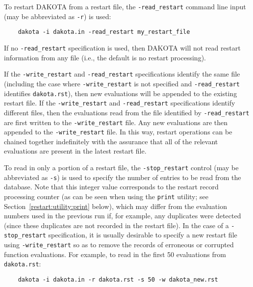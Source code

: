 To restart DAKOTA from a restart file, the \texttt{-read\_restart}
command line input (may be abbreviated as \texttt{-r}) is used:
\begin{small}
\begin{verbatim}
    dakota -i dakota.in -read_restart my_restart_file
\end{verbatim}
\end{small}

If no \texttt{-read\_restart} specification is used, then DAKOTA will
not read restart information from any file (i.e., the default is no
restart processing).

If the \texttt{-write\_restart} and \texttt{-read\_restart}
specifications identify the same file (including the case where
\texttt{-write\_restart} is not specified and \texttt{-read\_restart}
identifies \texttt{dakota.rst}), then new evaluations will be appended
to the existing restart file. If the \texttt{-write\_restart} and
\texttt{-read\_restart} specifications identify different files, then
the evaluations read from the file identified by
\texttt{-read\_restart} are first written to the
\texttt{-write\_restart} file. Any new evaluations are then appended
to the \texttt{-write\_restart} file. In this way, restart operations
can be chained together indefinitely with the assurance that all of
the relevant evaluations are present in the latest restart file.

To read in only a portion of a restart file, the
\texttt{-stop\_restart} control (may be abbreviated as \texttt{-s}) is
used to specify the number of entries to be read from the
database. Note that this integer value corresponds to the restart
record processing counter (as can be seen when using the
\texttt{print} utility; see Section~\ref{restart:utility:print} below),
which may differ from the evaluation numbers used in the previous run
if, for example, any duplicates were detected (since these duplicates
are not recorded in the restart file).  In the case of a
\texttt{-stop\_restart} specification, it is usually desirable to
specify a new restart file using \texttt{-write\_restart} so as to
remove the records of erroneous or corrupted function evaluations. For
example, to read in the first 50 evaluations from
\texttt{dakota.rst}:
\begin{small}
\begin{verbatim}
    dakota -i dakota.in -r dakota.rst -s 50 -w dakota_new.rst
\end{verbatim}
\end{small}

